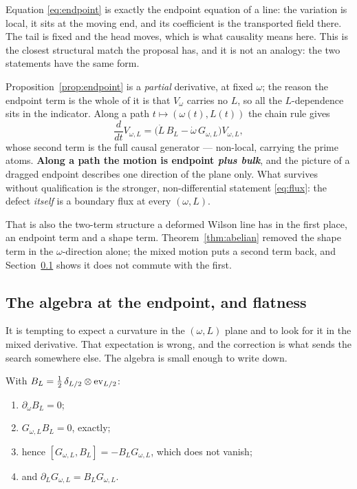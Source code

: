 Equation \eqref{eq:endpoint} is exactly the endpoint equation of a line: the
variation is local, it sits at the moving end, and its coefficient is the
transported field there. The tail is fixed and the head moves, which is what
causality means here. This is the closest structural match the proposal has, and
it is not an analogy: the two statements have the same form.

\begin{remark}\label{rem:pathqualification}
Proposition~\ref{prop:endpoint} is a \emph{partial} derivative, at fixed
$\omega$; the reason the endpoint term is the whole of it is that $V_\omega$
carries no $L$, so all the $L$-dependence sits in the indicator. Along a path
$t\mapsto(\omega(t),L(t))$ the chain rule gives
\[
 \frac{d}{dt}V_{\omega,L}
 =\big(\dot L\,B_L-\dot\omega\,G_{\omega,L}\big)V_{\omega,L},
\]
whose second term is the full causal generator --- non-local, carrying the prime
atoms. \textbf{Along a path the motion is endpoint \emph{plus bulk}}, and the
picture of a dragged endpoint describes one direction of the plane only. What
survives without qualification is the stronger, non-differential statement
\eqref{eq:flux}: the defect \emph{itself} is a boundary flux at every
$(\omega,L)$.

That is also the two-term structure a deformed Wilson line has in the first
place, an endpoint term and a shape term. Theorem~\ref{thm:abelian} removed the
shape term in the $\omega$-direction alone; the mixed motion puts a second term
back, and Section~\ref{subsec:algebra} shows it does not commute with the first.
\end{remark}

\subsection{The algebra at the endpoint, and flatness}\label{subsec:algebra}

It is tempting to expect a curvature in the $(\omega,L)$ plane and to look for it
in the mixed derivative. That expectation is wrong, and the correction is what
sends the search somewhere else. The algebra is small enough to write down.

\begin{proposition}\label{prop:algebra}
With $B_L=\frac12\,\delta_{L/2}\otimes\operatorname{ev}_{L/2}$:
\begin{enumerate}
\item $\partial_\omega B_L=0$;
\item $G_{\omega,L}B_L=0$, exactly;
\item hence $[G_{\omega,L},B_L]=-B_LG_{\omega,L}$, which does not vanish;
\item and $\partial_LG_{\omega,L}=B_LG_{\omega,L}$.
\end{enumerate}
\end{proposition}

